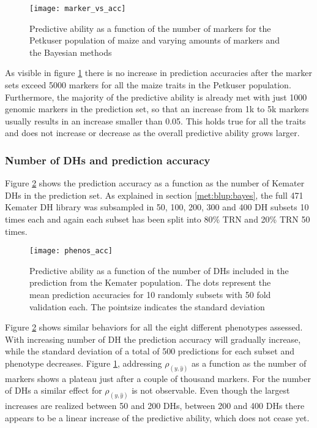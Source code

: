 \begin{figure}[H]
 \centering \texttt{[image: marker\_vs\_acc]}
 \decoRule
 \caption[Predictive ability as a function of the number of markers]{Predictive ability as
   a function of the number of markers for the Petkuser population of maize and varying
   amounts of markers and the Bayesian methods}
\label{fig:marker_vs_acc}
\end{figure}

As visible in figure \ref{fig:marker_vs_acc} there is no increase in prediction accuracies
after the marker sets exceed 5000 markers for all the maize traits in the Petkuser
population. Furthermore, the majority of the predictive ability is already met with just
1000 genomic markers in the prediction set, so that an increase from 1k to 5k markers
usually results in an increase smaller than 0.05. This holds true for all the traits and
does not increase or decrease as the overall predictive ability grows larger.

\subsubsection{Number of DHs and prediction accuracy}

Figure \ref{fig:phenos_vs_acc} shows the prediction accuracy as a function as the number
of Kemater DHs in the prediction set. As explained in section \ref{met:blup:bayes}, the
full 471 Kemater DH library was subsampled in 50, 100, 200, 300 and 400 DH subsets 10 times
each and again each subset has been split into 80\% TRN and 20\% TRN 50 times.

\begin{figure}[H]
 \centering \texttt{[image: phenos\_acc]}
 \decoRule
 \caption[Predictive ability as a function of the number of DHs]{Predictive ability as
   a function of the number of DHs included in the prediction from the Kemater
   population. The dots represent the mean prediction accuracies for 10 randomly subsets
   with 50 fold validation each. The pointsize indicates the standard deviation}
\label{fig:phenos_vs_acc}
\end{figure}

Figure \ref{fig:phenos_vs_acc} shows similar behaviors for all the eight different
phenotypes assessed. With increasing number of DH the prediction accuracy will gradually
increase, while the standard deviation of a total of 500 predictions for each subset and
phenotype decreases. Figure \ref{fig:marker_vs_acc}, addressing $\rho_{(y,\hat{y})}$ as a
function as the number of markers shows a plateau just after a couple of thousand
markers. For the number of DHs a similar effect for $\rho_{(y,\hat{y})}$ is not
observable. Even though the largest increases are realized between 50 and 200 DHs, between
200 and 400 DHs there appears to be a linear increase of the predictive ability, which
does not cease yet. 


